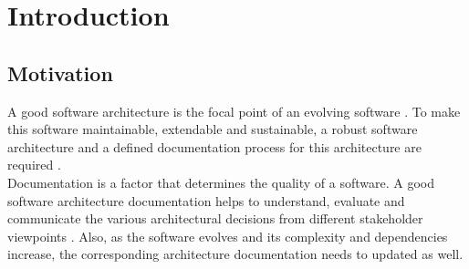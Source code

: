 \chapter{Introduction}\label{chapter:Introduction}

\section{Motivation}\label{sec:motiv}
\indent A good software architecture is the focal point of an evolving software \cite{Garlan2011}.  To make this software maintainable, extendable and sustainable, a robust software architecture and a defined documentation process for this architecture are required \cite{crouch_stephen_software_2013}.
\\\indent Documentation is a factor that determines the quality of a software. A good software architecture documentation helps to understand, evaluate and communicate the various architectural decisions from different stakeholder viewpoints \cite{BachmannDocumentingSoftware2010}. Also, as the software evolves and its complexity and dependencies increase, the corresponding architecture documentation needs to updated as well\cite{yeates_stuart_OSS_2008}.
